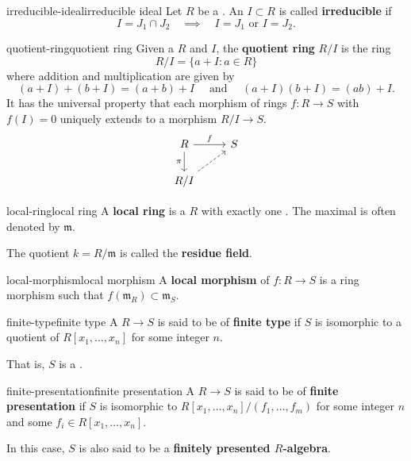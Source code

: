 \begin{topic}{irreducible-ideal}{irreducible ideal}
    Let $R$ be a . An  $I \subset R$ is called \textbf{irreducible} if
    \[ I = J_1 \cap J_2 \quad \implies \quad I = J_1 \text{ or } I = J_2 . \]
\end{topic}

\begin{topic}{quotient-ring}{quotient ring}
    Given a  $R$ and  $I$, the \textbf{quotient ring} $R/I$ is the ring
    \[ R/I = \{ a + I : a \in R \} \]
    where addition and multiplication are given by
    \[ (a + I) + (b + I) = (a + b) + I \quad \text{ and } \quad (a + I) (b + I) = (ab) + I . \]
    It has the universal property that each morphism of rings $f : R \to S$ with $f(I) = 0$ uniquely extends to a morphism $R/I \to S$.
    \[ \begin{tikzcd} R \arrow{r}{f} \arrow[swap]{d}{\pi} & S \\ R/I \arrow[dashed]{ur} & \end{tikzcd} \]
\end{topic}

\begin{topic}{local-ring}{local ring}
    A \textbf{local ring} is a  $R$ with exactly one . The maximal is often denoted by $\mathfrak{m}$.
    
    The quotient $k = R/\mathfrak{m}$ is called the \textbf{residue field}.
\end{topic}

\begin{topic}{local-morphism}{local morphism}
    A \textbf{local morphism} of  $f : R \to S$ is a ring morphism such that $f(\mathfrak{m}_R) \subset \mathfrak{m}_S$.
\end{topic}

\begin{topic}{finite-type}{finite type}
    A  $R \to S$ is said to be of \textbf{finite type} if $S$ is isomorphic to a quotient of $R[x_1, \ldots, x_n]$ for some integer $n$.
    
    That is, $S$ is a .
\end{topic}

\begin{topic}{finite-presentation}{finite presentation}
    A  $R \to S$ is said to be of \textbf{finite presentation} if $S$ is isomorphic to $R[x_1, \ldots, x_n] / (f_1, \ldots, f_m)$ for some integer $n$ and some $f_i \in R[x_1, \ldots, x_n]$.
    
    In this case, $S$ is also said to be a \textbf{finitely presented $R$-algebra}.
\end{topic}

